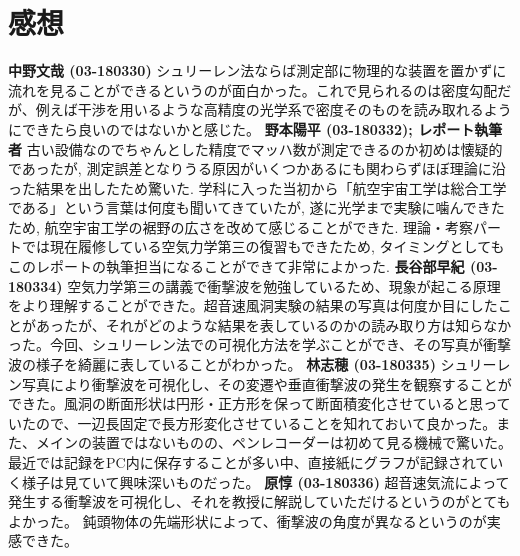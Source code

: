 \documentclass[12pt]{jsarticle}
\begin{document}
\section{感想} \noindent
{\bf 中野文哉 (03-180330)} \newline
シュリーレン法ならば測定部に物理的な装置を置かずに流れを見ることができるというのが面白かった。これで見られるのは密度勾配だが、例えば干渉を用いるような高精度の光学系で密度そのものを読み取れるようにできたら良いのではないかと感じた。 \newline
{\bf 野本陽平 (03-180332); レポート執筆者} \newline
古い設備なのでちゃんとした精度でマッハ数が測定できるのか初めは懐疑的であったが, 測定誤差となりうる原因がいくつかあるにも関わらずほぼ理論に沿った結果を出したため驚いた. 学科に入った当初から「航空宇宙工学は総合工学である」という言葉は何度も聞いてきていたが, 遂に光学まで実験に噛んできたため, 航空宇宙工学の裾野の広さを改めて感じることができた. 理論・考察パートでは現在履修している空気力学第三の復習もできたため, タイミングとしてもこのレポートの執筆担当になることができて非常によかった. \newline
{\bf 長谷部早紀 (03-180334)} \newline
空気力学第三の講義で衝撃波を勉強しているため、現象が起こる原理をより理解することができた。超音速風洞実験の結果の写真は何度か目にしたことがあったが、それがどのような結果を表しているのかの読み取り方は知らなかった。今回、シュリーレン法での可視化方法を学ぶことができ、その写真が衝撃波の様子を綺麗に表していることがわかった。\newline
{\bf 林志穂 (03-180335)} \newline
シュリーレン写真により衝撃波を可視化し、その変遷や垂直衝撃波の発生を観察することができた。風洞の断面形状は円形・正方形を保って断面積変化させていると思っていたので、一辺長固定で長方形変化させていることを知れておいて良かった。また、メインの装置ではないものの、ペンレコーダーは初めて見る機械で驚いた。最近では記録をPC内に保存することが多い中、直接紙にグラフが記録されていく様子は見ていて興味深いものだった。 \newline
{\bf 原惇 (03-180336)} \newline
超音速気流によって発生する衝撃波を可視化し、それを教授に解説していただけるというのがとてもよかった。
鈍頭物体の先端形状によって、衝撃波の角度が異なるというのが実感できた。 \newline
\end{document}
